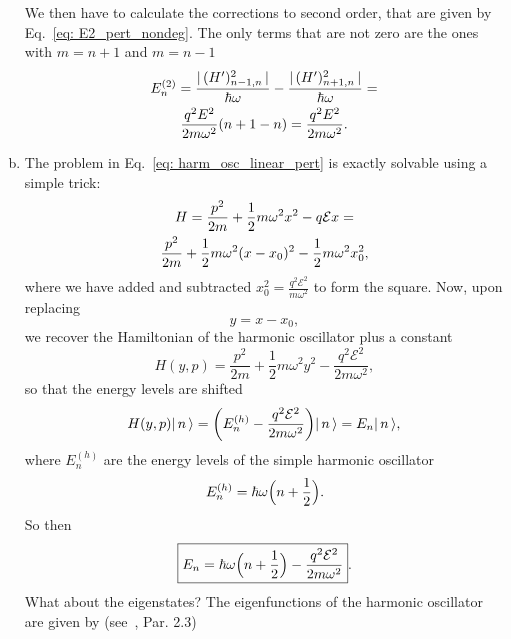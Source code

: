 \begin{enumerate}[(a)]
    We then have to calculate the corrections to second order, that are given by Eq.~\eqref{eq: E2_pert_nondeg}. The only terms that are not zero are the ones with $m = n+1$ and $m=n-1$
    \begin{gather}
        E_n^{(2)} = \frac{ |\, (H')_{n-1,n}^2 \,| }{\hbar \omega} - \frac{ |\, (H')_{n+1,n}^2 \,| }{\hbar \omega} = \notag \\
        \frac{q^2 E^2}{2 m \omega^2} (n + 1 - n) = \frac{q^2 E^2}{2 m \omega^2}.
    \end{gather}
    \item The problem in Eq.~\eqref{eq: harm_osc_linear_pert} is exactly solvable using a simple trick:
    \begin{gather}
        H = \frac{p^2}{2 m} + \frac{1}{2} m \omega^2 x^2 - q \mathcal{E} x = \notag \\
        \frac{p^2}{2 m} + \frac{1}{2} m \omega^2 ( x - x_0 )^2 - \frac{1}{2} m \omega^2 x_0^2,
    \end{gather}
    where we have added and subtracted $ x_0^2 = \frac{q^2 \mathcal{E}^2}{m \omega^2} $ to form the square. Now, upon replacing
    \begin{equation}
        \label{eq: sub_harm_linear_pert}
        y = x - x_0,
    \end{equation}
    we recover the Hamiltonian of the harmonic oscillator plus a constant 
    \begin{equation}
        \label{eq: ham_harm_linear_pert}
        H(y, p) = \frac{p^2}{2 m} + \frac{1}{2} m \omega^2 y^2 - \frac{q^2 \mathcal{E}^2}{2 m \omega^2},
    \end{equation}
    so that the energy levels are shifted 
    \begin{equation}
        H(y, p) | \, n \, \rangle = \biggl( E_n^{(h)} - \frac{q^2 \mathcal{E}^2}{2 m \omega^2} \biggr) | \, n \, \rangle = E_n | \, n \, \rangle,
    \end{equation}
    where $ E_n^{(h)} $ are the energy levels of the simple harmonic oscillator
    \begin{equation}
        \label{eq: En_harm_osc}
        E_n^{(h)} = \hbar \omega \Bigl( n + \frac{1}{2} \Bigr).
    \end{equation}
    So then 
    \begin{equation}
        \boxed{E_n = \hbar \omega \Bigl( n + \frac{1}{2} \Bigr) - \frac{q^2 \mathcal{E}^2}{2 m \omega^2}}.
    \end{equation}
    What about the eigenstates? The eigenfunctions of the harmonic oscillator are given by (see~\cite{griffiths2018introduction}, Par. 2.3)

\end{enumerate}
